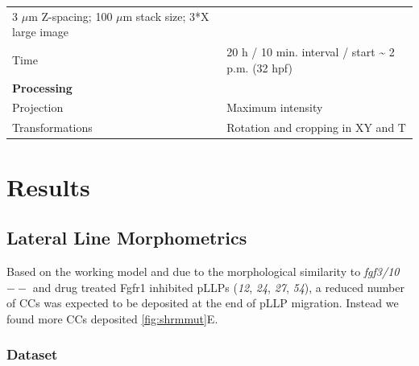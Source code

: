 \documentclass[11pt,singlespacinge,twoside]{reedthesis} %
\begin{document}
\begin{longtable}[]{@{}ll@{}}
\begin{minipage}[t]{0.73\columnwidth}
3 \(\mu\)m Z-spacing; 100 \(\mu\)m stack size; 3*X large image\strut
\end{minipage}\tabularnewline
\begin{minipage}[t]{0.21\columnwidth}\raggedright
Time\strut
\end{minipage} & \begin{minipage}[t]{0.73\columnwidth}\raggedright
20 h / 10 min. interval / start \textasciitilde{} 2 p.m. (32 hpf)\strut
\end{minipage}\tabularnewline
\begin{minipage}[t]{0.21\columnwidth}\raggedright
\textbf{Processing}\strut
\end{minipage} & \begin{minipage}[t]{0.73\columnwidth}\raggedright
\strut
\end{minipage}\tabularnewline
\begin{minipage}[t]{0.21\columnwidth}\raggedright
Projection\strut
\end{minipage} & \begin{minipage}[t]{0.73\columnwidth}\raggedright
Maximum intensity\strut
\end{minipage}\tabularnewline
\begin{minipage}[t]{0.21\columnwidth}\raggedright
Transformations\strut
\end{minipage} & \begin{minipage}[t]{0.73\columnwidth}\raggedright
Rotation and cropping in XY and T\strut
\end{minipage}\tabularnewline
\bottomrule
\end{longtable}
\hypertarget{results-1}{%
\chapter{Results}\label{results-1}}

\hypertarget{lateral-line-morphometrics}{%
\section{Lateral Line Morphometrics}\label{lateral-line-morphometrics}}

Based on the working model and due to the morphological similarity to \emph{fgf3/10}\(--\) and drug treated Fgfr1 inhibited pLLPs (\emph{12}, \emph{24}, \emph{27}, \emph{54}), a reduced number of CCs was expected to be deposited at the end of pLLP migration. Instead we found more CCs deposited \ref{fig:shrmmut}E.

\hypertarget{dataset}{%
\subsection{Dataset}\label{dataset}}
\end{document}
